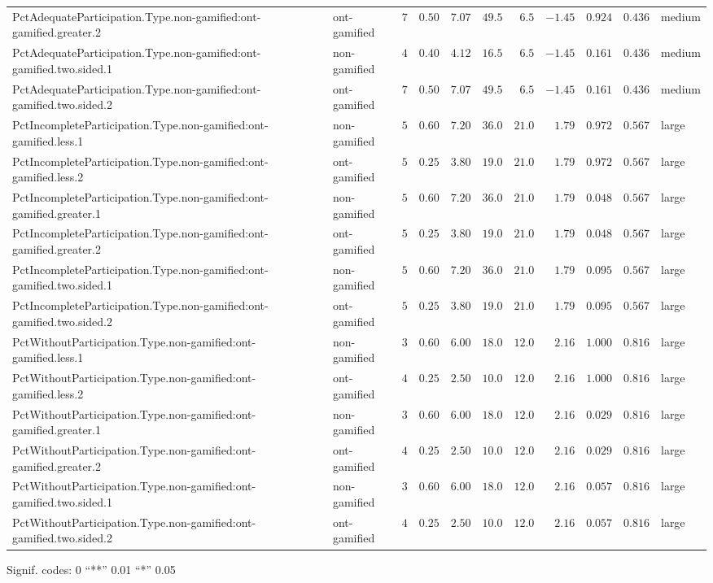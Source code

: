 \documentclass[6pt]{article}
\begin{document}
\begin{landscape}
{\begin{longtable}{llrrrrrrrrl}
PctAdequateParticipation.Type.non-gamified:ont-gamified.greater.2&ont-gamified&$7$&$0.50$&$7.07$&$49.5$&$ 6.5$&$-1.45$&$0.924$&$0.436$&medium\tabularnewline
PctAdequateParticipation.Type.non-gamified:ont-gamified.two.sided.1&non-gamified&$4$&$0.40$&$4.12$&$16.5$&$ 6.5$&$-1.45$&$0.161$&$0.436$&medium\tabularnewline
PctAdequateParticipation.Type.non-gamified:ont-gamified.two.sided.2&ont-gamified&$7$&$0.50$&$7.07$&$49.5$&$ 6.5$&$-1.45$&$0.161$&$0.436$&medium\tabularnewline
PctIncompleteParticipation.Type.non-gamified:ont-gamified.less.1&non-gamified&$5$&$0.60$&$7.20$&$36.0$&$21.0$&$ 1.79$&$0.972$&$0.567$&large\tabularnewline
PctIncompleteParticipation.Type.non-gamified:ont-gamified.less.2&ont-gamified&$5$&$0.25$&$3.80$&$19.0$&$21.0$&$ 1.79$&$0.972$&$0.567$&large\tabularnewline
PctIncompleteParticipation.Type.non-gamified:ont-gamified.greater.1&non-gamified&$5$&$0.60$&$7.20$&$36.0$&$21.0$&$ 1.79$&$0.048$&$0.567$&large\tabularnewline
PctIncompleteParticipation.Type.non-gamified:ont-gamified.greater.2&ont-gamified&$5$&$0.25$&$3.80$&$19.0$&$21.0$&$ 1.79$&$0.048$&$0.567$&large\tabularnewline
PctIncompleteParticipation.Type.non-gamified:ont-gamified.two.sided.1&non-gamified&$5$&$0.60$&$7.20$&$36.0$&$21.0$&$ 1.79$&$0.095$&$0.567$&large\tabularnewline
PctIncompleteParticipation.Type.non-gamified:ont-gamified.two.sided.2&ont-gamified&$5$&$0.25$&$3.80$&$19.0$&$21.0$&$ 1.79$&$0.095$&$0.567$&large\tabularnewline
PctWithoutParticipation.Type.non-gamified:ont-gamified.less.1&non-gamified&$3$&$0.60$&$6.00$&$18.0$&$12.0$&$ 2.16$&$1.000$&$0.816$&large\tabularnewline
PctWithoutParticipation.Type.non-gamified:ont-gamified.less.2&ont-gamified&$4$&$0.25$&$2.50$&$10.0$&$12.0$&$ 2.16$&$1.000$&$0.816$&large\tabularnewline
PctWithoutParticipation.Type.non-gamified:ont-gamified.greater.1&non-gamified&$3$&$0.60$&$6.00$&$18.0$&$12.0$&$ 2.16$&$0.029$&$0.816$&large\tabularnewline
PctWithoutParticipation.Type.non-gamified:ont-gamified.greater.2&ont-gamified&$4$&$0.25$&$2.50$&$10.0$&$12.0$&$ 2.16$&$0.029$&$0.816$&large\tabularnewline
PctWithoutParticipation.Type.non-gamified:ont-gamified.two.sided.1&non-gamified&$3$&$0.60$&$6.00$&$18.0$&$12.0$&$ 2.16$&$0.057$&$0.816$&large\tabularnewline
PctWithoutParticipation.Type.non-gamified:ont-gamified.two.sided.2&ont-gamified&$4$&$0.25$&$2.50$&$10.0$&$12.0$&$ 2.16$&$0.057$&$0.816$&large\tabularnewline
\hline
\end{longtable}}\end{landscape}
\begin{flushright}{ \tiny{ Signif. codes:  0 ``**'' 0.01 ``*'' 0.05 }}\end{flushright} 
\end{document}
